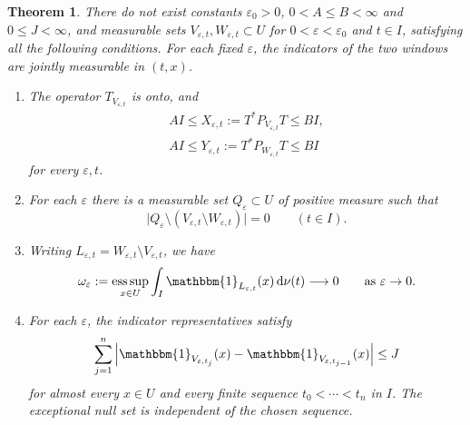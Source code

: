 \documentclass[12pt,reqno,tbtags]{amsart}
\newtheorem{theorem}{Theorem}[section]
\def\d{\mathrm{d}}
\newcommand\1{\mathbbm{1}}
\newcommand{\eps}{\varepsilon}
\def\d{\mathrm{d}}
\begin{document}
\begin{theorem}\label{thm:abstract-windows}
There do not exist constants $\eps_0>0$, $0<A\le B<\infty$ and $0\le J<\infty$,
and measurable sets $V_{\eps,t},W_{\eps,t}\subset U$ for
$0<\eps<\eps_0$ and $t\in I$, satisfying all the following conditions.
For each fixed $\eps$, the indicators of the two windows are jointly measurable
in $(t,x)$.
\begin{enumerate}
    \item[(i)] The operator $T_{V_{\eps,t}}$ is onto, and
    \begin{equation}\label{eq:main-window-bounds}
        \begin{aligned}
            AI\le X_{\eps,t}:=T^*P_{V_{\eps,t}}T\le BI,\\
            AI\le Y_{\eps,t}:=T^*P_{W_{\eps,t}}T\le BI
        \end{aligned}
    \end{equation}
    for every $\eps,t$.

    \item[(ii)] For each $\eps$ there is a measurable set $Q_\eps\subset U$
    of positive measure such that
    \begin{equation*}
        \bigl|Q_\eps\setminus(V_{\eps,t}\setminus W_{\eps,t})\bigr|=0
        \qquad(t\in I).
    \end{equation*}

    \item[(iii)] Writing $L_{\eps,t}=W_{\eps,t}\setminus V_{\eps,t}$, we have
    \begin{equation}\label{eq:main-loss-overlap}
        \omega_\eps:=\operatorname*{ess\,sup}_{x\in U}
        \int_I\1_{L_{\eps,t}}(x)\,\d\nu(t)
        \longrightarrow0\qquad{\rm{as}}\ \eps\to0.
    \end{equation}

    \item[(iv)] For each $\eps$, the indicator representatives satisfy
    \begin{equation}\label{eq:main-turnover}
        \sum_{j=1}^{n}
        \left|\1_{V_{\eps,t_j}}(x)-\1_{V_{\eps,t_{j-1}}}(x)\right|
        \le J
    \end{equation}
    for almost every $x\in U$ and every finite sequence
    $t_0<\cdots<t_n$ in $I$. The exceptional null set is independent of
    the chosen sequence.
\end{enumerate}
\end{theorem}
\end{document}
